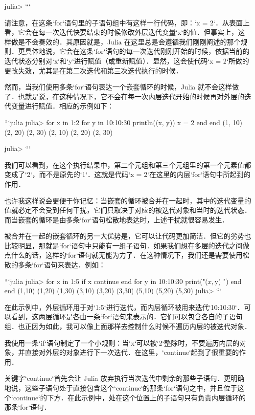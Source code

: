 julia> 
```

请注意，在这条`for`语句里的子语句组中有这样一行代码，即：`x = 2`．从表面上看，它会在每一次迭代快要结束的时候修改外层迭代变量`x`的值．但事实上，这样做是不会奏效的．其原因就是，Julia 在这里总是会遵循我们刚刚阐述的那个规则．更具体地说，它会在这条`for`语句的每一次迭代刚刚开始的时候，依据当前的迭代状态分别对`x`和`y`进行赋值（或重新赋值）．显然，这会使代码`x = 2`所做的更改失效，尤其是在第二次迭代和第三次迭代执行的时候．

然而，当我们使用多条`for`语句表达一个嵌套循环的时候，Julia 就不会这样做了．也就是说，在这种情况下，它不会在每一次内层迭代开始的时候再对外层的迭代变量进行赋值．相应的示例如下：

```julia
julia> for x in 1:2
           for y in 10:10:30
               println((x, y))
               x = 2
           end
       end
(1, 10)
(2, 20)
(2, 30)
(2, 10)
(2, 20)
(2, 30)

julia> 
```

我们可以看到，在这个执行结果中，第二个元组和第三个元组里的第一个元素值都变成了`2`，而不是原先的`1`．这就是代码`x = 2`在这里的内层`for`语句中所起到的作用．

也许我这样说会更便于你记忆：当嵌套的循环被合并在一起时，其中的迭代变量的值就必定不会受到任何干扰，它们只取决于对应的被迭代对象和当时的迭代状态．而当嵌套的循环是由多条`for`语句松散地表达时，上述干扰就很容易发生．

被合并在一起的嵌套循环的另一大优势是，它可以让代码更加简洁．但它的劣势也比较明显，那就是`for`语句中只能有一组子语句．如果我们想在多层的迭代之间做点什么的话，这样的`for`语句就无能为力了．在这种情况下，我们还是需要使用松散的多条`for`语句来表达．例如：

```julia
julia> for x in 1:5
           if x %
               continue
           end
           for y in 10:10:30
               print("($x,$y) ")
           end
       end
(1,10) (1,20) (1,30) (3,10) (3,20) (3,30) (5,10) (5,20) (5,30) 
julia> 
```

在此示例中，外层循环用于对`1:5`进行迭代，而内层循环被用来迭代`10:10:30`．可以看到，这两层循环是各由一条`for`语句来表示的．它们可以包含各自的子语句组．也正因为如此，我可以像上面那样去控制什么时候不遍历内层的被迭代对象．

我使用一条`if`语句制定了一个小规则：当`x`可以被`2`整除时，不要遍历内层的对象，并直接对外层的对象进行下一次迭代．在这里，`continue`起到了很重要的作用．

关键字`continue`首先会让 Julia 放弃执行当次迭代中剩余的那些子语句．更明确地说，这些子语句处于直接包含这个`continue`的那条`for`语句之中，并且位于这个`continue`的下方．在此示例中，处在这个位置上的子语句只有负责内层循环的那条`for`语句．

